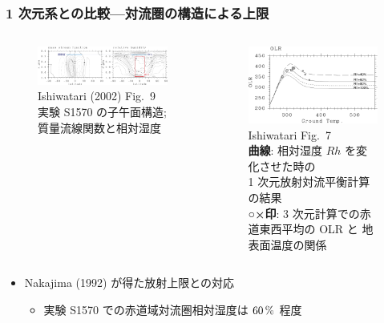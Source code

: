 \documentclass[aspectratio=149,9pt,fleqn]{beamer}
\newcommand{\hmemph}[1]{\textbf{#1}}
\begin{document}
\begin{frame}
	\frametitle{1 次元系との比較---対流圏の構造による上限}
	\begin{columns}[b]
		\begin{column}{.48\textwidth}
			\begin{figure}
				\includegraphics[width=.9\textwidth]{zu-crop.pdf}\\
				\scriptsize Ishiwatari \etal (2002) Fig.\ 9\\
				実験 S1570 の子午面構造; 質量流線関数と相対湿度
			\end{figure}
		\end{column}
		\begin{column}{.5\textwidth}
			\begin{figure}
				\scriptsize
				\includegraphics[width=.7\textwidth]{./fig/Tg-OLR-1dimL99-3dEq-crop.pdf}\\
				Ishiwatari \etal Fig.~7\\
				\hmemph{曲線}: 相対湿度 \(\mathit{Rh}\) を変化させた時の\\
				1 次元放射対流平衡計算の結果\\
				\hmemph{○×印}: 3 次元計算での赤道東西平均の OLR と 地表面温度の関係
			\end{figure}
		\end{column}
	\end{columns}
	\begin{itemize}
		\item Nakajima \etal (1992) が得た放射上限との対応
			\begin{itemize}
				\item 実験 S1570 での赤道域対流圏相対湿度は \(60\hmu{\%}\) 程度

\end{itemize}
\end{itemize}
\end{frame}
\end{document}
